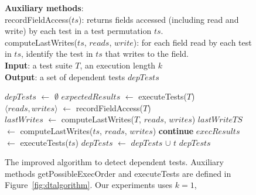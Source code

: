 \begin{figure}[t]
\textbf{Auxiliary methods}:\\
recordFieldAccess($ts$): returns fields accessed (including read and write) by each test in a test permutation $ts$. \\
computeLastWrites($ts$, $reads$, $write$): for each field read by each test in $ts$, identify the test in $ts$ that writes to the field.\\
\textbf{Input}: a test suite $\mathit{T}$, an execution length $\mathit{k}$\\
\textbf{Output}: a set of dependent tests $\mathit{depTests}$\\
\vspace{-5mm}
\begin{algorithmic}[1]
\STATE $\mathit{depTests}$ $\leftarrow$ $\emptyset$
\STATE $\mathit{expectedResults}$ $\leftarrow$ executeTests($T$)\\
\STATE $\langle reads, writes\rangle$ $\leftarrow$ recordFieldAccess($T$)
\\
\STATE $\mathit{lastWrites}$ $\leftarrow$ computeLastWrites($T$, $\mathit{reads}$, $\mathit{writes}$)
\STATE $\mathit{lastWriteTS}$ $\leftarrow$ computeLastWrites($ts$, $\mathit{reads}$, $\mathit{writes}$)
\vspace{-3mm}
\STATE \textbf{continue}
\ENDIF
\STATE $\mathit{execResults}$ $\leftarrow$ executeTests($\mathit{ts}$)
\STATE $\mathit{depTests}$ $\leftarrow$ $\mathit{depTests}$ $\cup$ $\mathit{t}$
\ENDIF
\ENDFOR
\ENDFOR
\RETURN $\mathit{depTests}$
\end{algorithmic}
\vspace{-3mm}
\caption {The improved algorithm to detect dependent tests.
Auxiliary methods getPossibleExecOrder and executeTests are
defined in Figure~\ref{fig:dtalgorithm}.
Our experiments uses $k=1$,  } 
\label{fig:impralg}
\end{figure}


